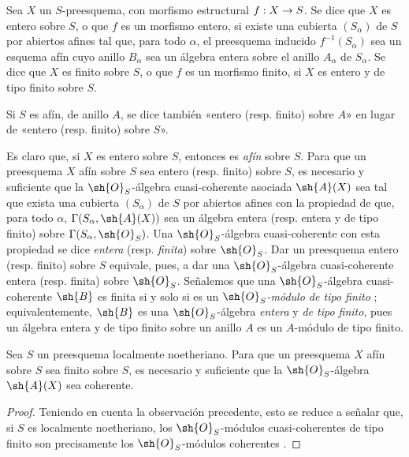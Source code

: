 \documentclass[oneside,10pt]{amsart}
\makeatletter
\newcommand{\ega@arrow}[2]{\mathchoice{#1}{#2}{#2}{#2}}
\renewcommand{\to}{\ega@arrow{\longrightarrow}{\rightarrow}}
\let\EGAOriginalLabel\label
\renewcommand{\label}[1]{\phantomsection\EGAOriginalLabel{#1}}
\makeatother
\begin{document}
\begin{definition}[6.1.1]
\label{II.6.1.1}
Sea $X$ un $S$-preesquema, con morfismo estructural $f:X\to S$.
Se dice que $X$ es entero sobre $S$, o que $f$ es un morfismo entero, si existe una cubierta $(S_\alpha)$ de $S$ por abiertos afines tal que, para todo $\alpha$, el preesquema inducido $f^{-1}(S_\alpha)$ sea un esquema afín cuyo anillo $B_\alpha$ sea un álgebra entera sobre el anillo $A_\alpha$ de $S_\alpha$.
Se dice que $X$ es finito sobre $S$, o que $f$ es un morfismo finito, si $X$ es entero y de tipo finito sobre $S$.
\end{definition}

Si $S$ es afín, de anillo $A$, se dice también «entero (resp. finito) sobre $A$» en lugar de «entero (resp. finito) sobre $S$».

\begin{env}[6.1.2]
\label{II.6.1.2}
Es claro que, si $X$ es entero sobre $S$, entonces es \emph{afín} sobre $S$.
Para que un preesquema $X$ afín sobre $S$ sea entero (resp. finito) sobre $S$, es necesario y suficiente que la $\sh{O}_S$-álgebra cuasi-coherente asociada $\sh{A}(X)$ sea tal que exista una cubierta $(S_\alpha)$ de $S$ por abiertos afines con la propiedad de que, para todo $\alpha$, $\Gamma(S_\alpha,\sh{A}(X))$ sea un álgebra entera (resp. entera y de tipo finito) sobre $\Gamma(S_\alpha,\sh{O}_S)$.
Una $\sh{O}_S$-álgebra cuasi-coherente con esta propiedad se dice \emph{entera} (resp. \emph{finita}) sobre $\sh{O}_S$.
Dar un preesquema entero (resp. finito) sobre $S$ equivale, pues,  a dar una $\sh{O}_S$-álgebra cuasi-coherente entera (resp. finita) sobre $\sh{O}_S$.
Señalemos que una $\sh{O}_S$-álgebra cuasi-coherente $\sh{B}$ es finita si y solo si es un \emph{$\sh{O}_S$-módulo de tipo finito} ;
equivalentemente, $\sh{B}$ es una $\sh{O}_S$-álgebra \emph{entera} y \emph{de tipo finito}, pues un álgebra entera y de tipo finito sobre un anillo $A$ es un $A$-módulo de tipo finito.
\end{env}

\begin{proposition}[6.1.3]
\label{II.6.1.3}
Sea $S$ un preesquema localmente noetheriano.
Para que un preesquema $X$ afín sobre $S$ sea finito sobre $S$, es necesario y suficiente que la $\sh{O}_S$-álgebra $\sh{A}(X)$ sea coherente.
\end{proposition}

\begin{proof}
Teniendo en cuenta la observación precedente, esto se reduce a señalar que, si $S$ es localmente noetheriano, los $\sh{O}_S$-módulos cuasi-coherentes de tipo finito son precisamente los $\sh{O}_S$-módulos coherentes .
\end{proof}
\end{document}
